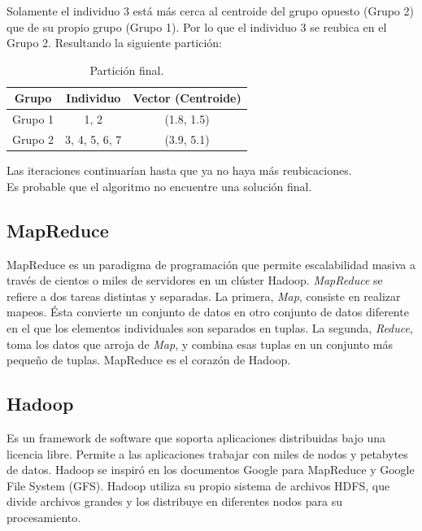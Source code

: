 \begin{UClist}
	\UCli Solamente el individuo 3 está más cerca al centroide del grupo opuesto (Grupo 2) que de su propio grupo (Grupo 1). Por lo que el individuo 3 se reubica en el Grupo 2. Resultando la siguiente partición:\\

	\begin{table}[H]
		\begin{center}
			\label{tab:particionFinal}
			\begin{tabular}{c|c|c}
				\textbf{Grupo} & \textbf{Individuo} & \textbf{Vector (Centroide)}\\
				\hline
				Grupo 1 & 1, 2 & (1.8, 1.5)\\
				Grupo 2 & 3, 4, 5, 6, 7 & (3.9, 5.1)\\
			\end{tabular}
		\end{center}
		\caption{Partición final.}
	\end{table}

	\UCli Las iteraciones continuarían hasta que ya no haya más reubicaciones.\\

	\UCli Es probable que el algoritmo no encuentre una solución final.

\end{UClist}

\subsection{MapReduce}
MapReduce es un paradigma de programación que permite escalabilidad masiva a través de cientos o miles de servidores en un clúster Hadoop. \emph{MapReduce} se refiere a dos tareas distintas y separadas. La primera, \emph{Map}, consiste en realizar mapeos. Ésta convierte un conjunto de datos en otro conjunto de datos diferente en el que los elementos individuales son separados en tuplas. La segunda, \emph{Reduce}, toma los datos que arroja de \emph{Map}, y combina esas tuplas en un conjunto más pequeño de tuplas. MapReduce es el corazón de Hadoop.\\

\subsection{Hadoop} \label{sect:hadoop}
Es un framework de software que soporta aplicaciones distribuidas bajo una licencia libre. Permite a las aplicaciones trabajar con miles de nodos y petabytes de datos. Hadoop se inspiró en los documentos Google para MapReduce y Google File System (GFS). Hadoop utiliza su propio sistema de archivos HDFS, que divide archivos grandes y los distribuye en diferentes nodos para su procesamiento.\\

